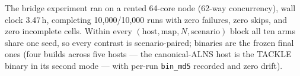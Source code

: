 The bridge experiment ran on a rented 64-core node (62-way concurrency), wall clock
3.47\,h, completing 10{,}000/10{,}000 runs with zero failures, zero skips, and zero
incomplete cells. Within every $(\text{host},\text{map},N,\text{scenario})$ block all
ten arms share one seed, so every contrast is scenario-paired; binaries are the frozen
final ones (four builds across five hosts --- the canonical-ALNS host is the TACKLE
binary in its second mode --- with per-run \texttt{bin\_md5} recorded and zero drift).
